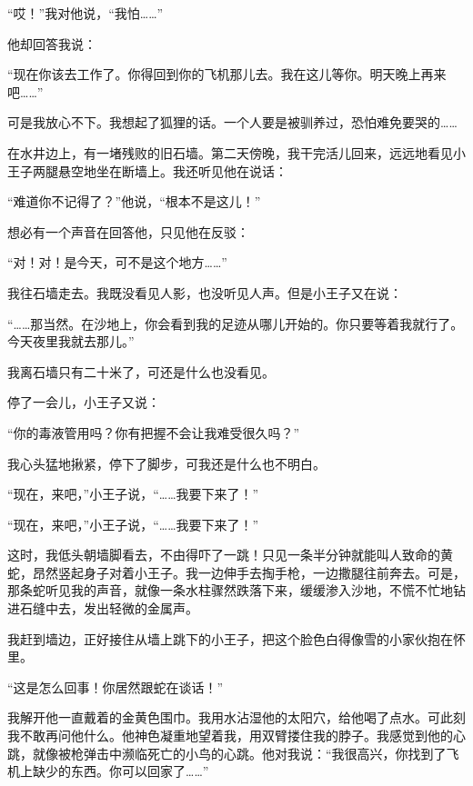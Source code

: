 “哎！”我对他说，“我怕\ldots{}\ldots{}”

他却回答我说：

“现在你该去工作了。你得回到你的飞机那儿去。我在这儿等你。明天晚上再来吧\ldots{}\ldots{}”

可是我放心不下。我想起了狐狸的话。一个人要是被驯养过，恐怕难免要哭的\ldots{}\ldots{}


\stoptitle

\starttitle[title={26},reference={part0028.html_a029}]

在水井边上，有一堵残败的旧石墙。第二天傍晚，我干完活儿回来，远远地看见小王子两腿悬空地坐在断墙上。我还听见他在说话：

“难道你不记得了？”他说，“根本不是这儿！”

想必有一个声音在回答他，只见他在反驳：

“对！对！是今天，可不是这个地方\ldots{}\ldots{}”

我往石墙走去。我既没看见人影，也没听见人声。但是小王子又在说：

“\ldots{}\ldots{}那当然。在沙地上，你会看到我的足迹从哪儿开始的。你只要等着我就行了。今天夜里我就去那儿。”

我离石墙只有二十米了，可还是什么也没看见。

停了一会儿，小王子又说：

“你的毒液管用吗？你有把握不会让我难受很久吗？”

我心头猛地揪紧，停下了脚步，可我还是什么也不明白。

“现在，来吧，”小王子说，“\ldots{}\ldots{}我要下来了！”

{\startalignment[center]
 \stopalignment}

“现在，来吧，”小王子说，“\ldots{}\ldots{}我要下来了！”

这时，我低头朝墙脚看去，不由得吓了一跳！只见一条半分钟就能叫人致命的黄蛇，昂然竖起身子对着小王子。我一边伸手去掏手枪，一边撒腿往前奔去。可是，那条蛇听见我的声音，就像一条水柱骤然跌落下来，缓缓渗入沙地，不慌不忙地钻进石缝中去，发出轻微的金属声。

我赶到墙边，正好接住从墙上跳下的小王子，把这个脸色白得像雪的小家伙抱在怀里。

“这是怎么回事！你居然跟蛇在谈话！”

我解开他一直戴着的金黄色围巾。我用水沾湿他的太阳穴，给他喝了点水。可此刻我不敢再问他什么。他神色凝重地望着我，用双臂搂住我的脖子。我感觉到他的心跳，就像被枪弹击中濒临死亡的小鸟的心跳。他对我说：“我很高兴，你找到了飞机上缺少的东西。你可以回家了\ldots{}\ldots{}”

